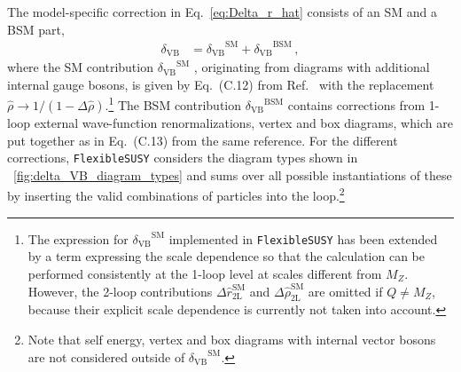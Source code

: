 \documentclass[final,3p,11pt,pdflatex]{elsarticle}
\makeatletter
\newcommand{\fs}{\texttt{FlexibleSUSY}\@\xspace}
\newcommand{\SM}{\ensuremath{\text{SM}}\xspace}
\newcommand{\BSM}{\ensuremath{\text{BSM}}\xspace}
\newcommand{\deltaVB}{\ensuremath{\delta_{\text{VB}}}\xspace}
\newcommand{\figref}[1]{\figurename~\ref{#1}}
\makeatother
\begin{document}
The model-specific correction in Eq.~\eqref{eq:Delta_r_hat}
consists of an SM and a BSM part,
%
\begin{align}
   \deltaVB &= \deltaVB^\SM + \deltaVB^\BSM\,,
\end{align}
%
where the SM contribution $\deltaVB^\SM$
\cite{Degrassi:1990tu}, originating
from diagrams with additional internal gauge bosons, is given by
Eq.~(C.12) from Ref.~\cite{Pierce:1996zz} with the replacement
$\hat\rho \rightarrow 1/(1-\Delta\hat\rho)$.\footnote{The expression
  for $\deltaVB^\SM$ implemented in \fs has been extended by a term
  expressing the scale dependence so that the calculation can be
  performed consistently at the 1-loop level at scales different from
  $M_Z$.  However, the 2-loop contributions
  $\Delta\hat{r}_\text{2L}^\SM$ and $\Delta\hat\rho_\text{2L}^\SM$ are
  omitted if $Q \neq M_Z$, because their explicit scale dependence is
  currently not taken into account.}
The BSM contribution $\deltaVB^\BSM$ contains corrections from
1-loop external wave-function renormalizations, vertex and
box diagrams, which are put together as in Eq.~(C.13) from the
same reference. For the different corrections, \fs considers the
diagram types shown in \figref{fig:delta_VB_diagram_types} and sums
over all possible instantiations of these by inserting the valid
combinations of particles into the loop.\footnote{ Note that
self energy, vertex and box diagrams with internal vector bosons
are not considered outside of $\deltaVB^\SM$.}
%
\end{document}

